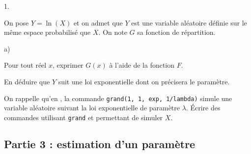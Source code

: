 \documentclass[11pt]{article}%
\begin{document}
\begin{noliste}{1.}
  \setlength{\itemsep}{4mm} %
  \setcounter{enumi}{5}
\item On pose $Y = \ln(X)$ et on admet que $Y$ est une variable
  aléatoire définie sur le même espace probabilisé que $X$. On note
  $G$ sa fonction de répartition.
  \begin{noliste}{a)}
    \setlength{\itemsep}{2mm}
  \item Pour tout réel $x$, exprimer $G(x)$ à l'aide de la fonction
    $F$.
    
  \item En déduire que $Y$ suit une loi exponentielle dont on
    précisera le paramètre.
  \end{noliste}
  
\item On rappelle qu'en \Scilab{}, la commande {\tt grand(1, 1,
    \ttq{}exp\ttq{}, 1/lambda)} simule une variable aléatoire suivant
  la loi exponentielle de paramètre $\lambda$. Écrire des commandes
  \Scilab{} utilisant {\tt grand} et permettant de simuler $X$.
\end{noliste}


\subsection*{Partie 3 : estimation d'un paramètre}
\end{document}
